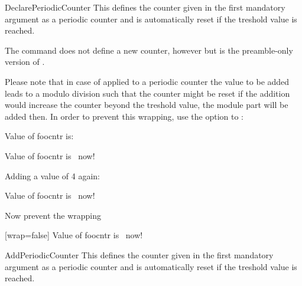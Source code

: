 \documentclass[12pt,a4paper,oneside]{article}
\makeatletter
\newcommand{\chdocextractversion}[1]{%
  \@nameuse{#1}%
}
\newcommand{\CHDocNew}[1]{%
  \tcbdocmarginnote[doclang/new={N},
  colframe=blue,
  halign=left,
  colback={blue!20!white},
  fontupper={\tiny}
  ]{%
    \chdocextractversion{xassoccntversion#1}%
  }%
}
\makeatother
\begin{document}
\begin{docCommand}[before={\CHDocNew{0.9}}]{DeclarePeriodicCounter}{\oarg{}}
This defines the counter given in the first mandatory argument as a periodic counter and is automatically reset if the treshold value is reached. 

\begin{marker}
The command  does not define a new counter, however but is the preamble-only version of . 
\end{marker}

Please note that in case of  applied to a periodic counter the value to be added leads to a modulo division such that the counter might be reset if the addition would increase the counter beyond the treshold value, the module part will be added then. In order to prevent this wrapping, use the  option to : 

\begin{dispExample}
  \setcounter{foocntr}{3}%
  
  Value of foocntr is: \thefoocntr  %

  \addtocounter{foocntr}{20} %
  Value of foocntr is \thefoocntr\ now! 

  Adding a value of 4 again: 
  \addtocounter{foocntr}{4} %
  Value of foocntr is \thefoocntr\ now! 

  Now prevent the wrapping
  \addtocounter{foocntr}{10}[wrap=false] %
  Value of foocntr is \thefoocntr\ now! 

\end{dispExample}
\end{docCommand}

\begin{docCommand}[before={\CHDocNew{0.9}}]{AddPeriodicCounter}{\oarg{}}
This defines the counter given in the first mandatory argument as a periodic counter and is automatically reset if the treshold value is reached. 
\end{docCommand}
\end{document}

